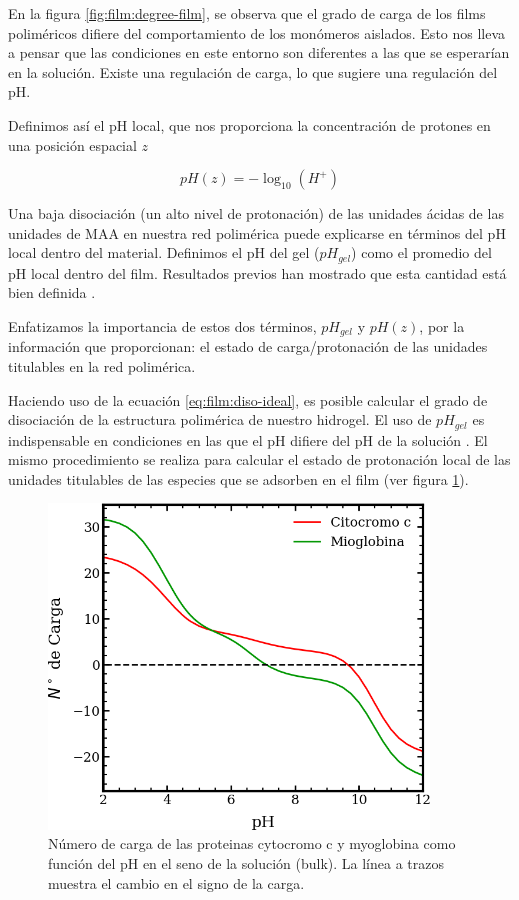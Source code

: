 En la figura \ref{fig:film:degree-film}, se observa que el grado de carga de los films polim\'ericos difiere del comportamiento de los mon\'omeros aislados. Esto nos lleva a pensar que las condiciones en este entorno son diferentes a las que se esperar\'ian en la soluci\'on. Existe una regulaci\'on de carga, lo que sugiere una regulaci\'on del pH.

Definimos as\'i el pH local, que nos proporciona la concentración de protones en una posición espacial $z$

\begin{equation}
	pH(z) = -\log_{10}(H^+)
	\label{eq:film:pH-local}
\end{equation}

Una baja disociaci\'on (un alto nivel de protonaci\'on) de las unidades \'acidas de las unidades de MAA en nuestra red polim\'erica puede explicarse en t\'erminos del pH local dentro del material. Definimos el pH del gel ($pH_{gel}$) como el promedio del pH local dentro del film. Resultados previos han mostrado que esta cantidad est\'a bien definida \cite{longo2014non}.

Enfatizamos la importancia de estos dos t\'erminos, $pH_{gel}$ y $pH(z)$, por la informaci\'on que proporcionan: el estado de carga/protonaci\'on de las unidades titulables en la red polim\'erica.

Haciendo uso de la ecuaci\'on \ref{eq:film:diso-ideal}, es posible calcular el grado de disociaci\'on de la estructura polim\'erica de nuestro hidrogel. El uso de $pH_{gel}$ es indispensable en condiciones en las que el pH difiere del pH de la soluci\'on . El mismo procedimiento se realiza para calcular el estado de protonaci\'on local de las unidades titulables de las especies que se adsorben en el film (ver figura \ref{fig:film:protein-charge}).


\begin{figure}
    \centering
    \includegraphics[width=0.9\textwidth]{Figures/graph-film/carga-proteinas.png}
    \caption{N\'umero de carga de las proteinas cytocromo c y myoglobina como  funci\'on del pH en el seno de la soluci\'on (bulk). La l\'inea a trazos muestra el cambio en el signo de la carga.}
    \label{fig:film:protein-charge}
\end{figure}


